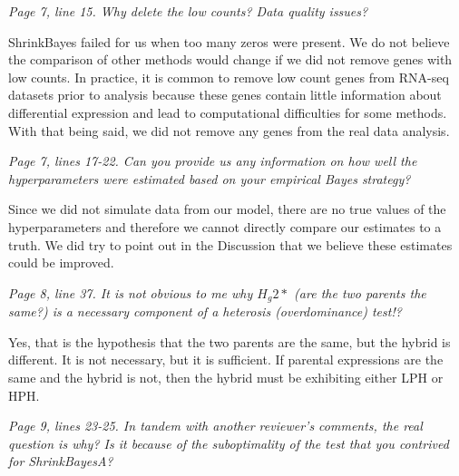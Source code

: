 \documentclass{article}
\newcommand{\comment}[1]{\textit{#1}}
\newcommand{\response}[1]{#1}
\newcommand{\todo}[1]{{\color{red} #1}}
\begin{document}
\comment{Page 7, line 15.  Why delete the low counts?  Data quality issues?}

\response{ShrinkBayes failed for us when too many zeros were present. We do not believe the comparison of other methods would change if we did not remove genes with low counts.  In practice, it is common to remove low count genes from RNA-seq datasets prior to analysis because these genes contain little information about differential expression and lead to computational difficulties for some methods. With that being said, we did not remove any genes from the real data analysis.}


\comment{Page 7, lines 17-22.  Can you provide us any information on how well the hyperparameters were estimated based on your empirical Bayes strategy?}

\response{Since we did not simulate data from our model, there are no true values of the hyperparameters and therefore we cannot directly compare our estimates to a truth.  We did try to point out in the Discussion that we believe these estimates could be improved.}

\comment{Page 8, line 37.  It is not obvious to me why $H_g2*$ (are the two parents the same?) is a necessary component of a heterosis (overdominance) test!?}

\response{Yes, that is the hypothesis that the two parents are the same, but the hybrid is different. It is not necessary, but it is sufficient. If parental expressions are the same and the hybrid is not, then the hybrid must be exhibiting either LPH or HPH.}

\comment{Page 9, lines 23-25.  In tandem with another reviewer’s comments, the real question is why?  Is it because of the suboptimality of the test that you contrived for ShrinkBayesA?}
\end{document}
